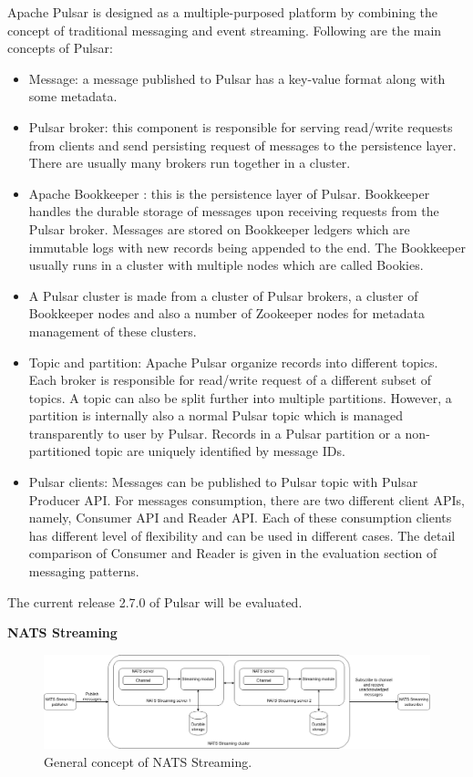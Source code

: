 Apache Pulsar is designed as a multiple-purposed platform by combining the concept of traditional messaging and event streaming. Following are the main concepts of Pulsar:
\begin{itemize}
	\item Message: a message published to Pulsar has a key-value format along with some metadata.
	\item Pulsar broker: this component is responsible for serving read/write requests from clients and send persisting request of messages to the persistence layer. There are usually many brokers run together in a cluster.
	\item Apache Bookkeeper \cite{apachebookkeeper}: this is the persistence layer of Pulsar. Bookkeeper handles the durable storage of messages upon receiving requests from the Pulsar broker. Messages are stored on Bookkeeper ledgers which are immutable logs with new records being appended to the end. The Bookkeeper usually runs in a cluster with multiple nodes which are called Bookies. 
	\item A Pulsar cluster is made from a cluster of Pulsar brokers, a cluster of Bookkeeper nodes and also a number of Zookeeper nodes for metadata management of these clusters.
	\item Topic and partition: Apache Pulsar organize records into different topics. Each broker is responsible for read/write request of a different subset of topics. A topic can also be split further into multiple partitions. However, a partition is internally also a normal Pulsar topic which is managed transparently to user by Pulsar. Records in a Pulsar partition or a non-partitioned topic are uniquely identified by message IDs.
	\item Pulsar clients: Messages can be published to Pulsar topic with Pulsar Producer API. For messages consumption, there are two different client APIs, namely, Consumer API and Reader API. Each of these consumption clients has different level of flexibility and can be used in different cases. The detail comparison of Consumer and Reader is given in the evaluation section of messaging patterns.
\end{itemize}

The current release 2.7.0 of Pulsar will be evaluated.

\textbf{NATS Streaming}
\begin{figure}[h]
	\centering
	\includegraphics[width=\linewidth]{images/general-nats.png}
	\caption{General concept of NATS Streaming.}
	\label{fig:pulsargeneral}
\end{figure}

